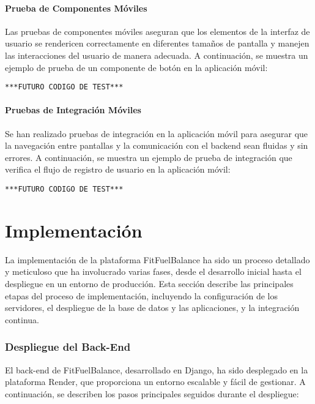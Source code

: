 \paragraph{Prueba de Componentes Móviles}
Las pruebas de componentes móviles aseguran que los elementos de la interfaz de usuario se rendericen correctamente en diferentes tamaños de pantalla y manejen las interacciones del usuario de manera adecuada. A continuación, se muestra un ejemplo de prueba de un componente de botón en la aplicación móvil:

\begin{verbatim}
***FUTURO CODIGO DE TEST***
\end{verbatim}

\paragraph{Pruebas de Integración Móviles}
Se han realizado pruebas de integración en la aplicación móvil para asegurar que la navegación entre pantallas y la comunicación con el backend sean fluidas y sin errores. A continuación, se muestra un ejemplo de prueba de integración que verifica el flujo de registro de usuario en la aplicación móvil:

\begin{verbatim}
***FUTURO CODIGO DE TEST***
\end{verbatim}

\section{Implementación}

La implementación de la plataforma FitFuelBalance ha sido un proceso detallado y meticuloso que ha involucrado varias fases, desde el desarrollo inicial hasta el despliegue en un entorno de producción. Esta sección describe las principales etapas del proceso de implementación, incluyendo la configuración de los servidores, el despliegue de la base de datos y las aplicaciones, y la integración continua.

\subsubsection{Despliegue del Back-End}
El back-end de FitFuelBalance, desarrollado en Django, ha sido desplegado en la plataforma Render, que proporciona un entorno escalable y fácil de gestionar. A continuación, se describen los pasos principales seguidos durante el despliegue:

